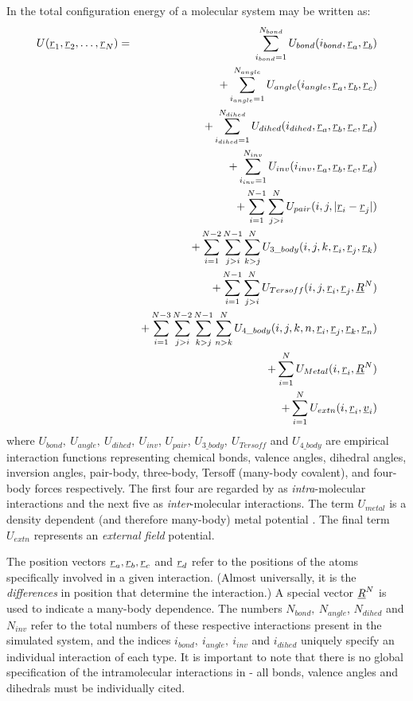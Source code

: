 In \D{} the total configuration energy of a molecular system may
be written as:
\begin{eqnarray}
U(\mbox{$\underline{r}$}_{1},\mbox{$\underline{r}$}_{2},\ldots,\mbox{$\underline{r}$}_{N})&=&
\sum_{i_{bond}=1}^{N_{bond}}
U_{bond}(i_{bond},\mbox{$\underline{r}$}_{a},\mbox{$\underline{r}$}_{b}) \nonumber \\ & &
+\sum_{i_{angle}=1}^{N_{angle}}
U_{angle}(i_{angle},\mbox{$\underline{r}$}_{a},\mbox{$\underline{r}$}_{b},\mbox{$\underline{r}$}_{c})\nonumber \\
& & +\sum_{i_{dihed}=1}^{N_{dihed}}
U_{dihed}(i_{dihed},\mbox{$\underline{r}$}_{a},\mbox{$\underline{r}$}_{b},\mbox{$\underline{r}$}_{c},\mbox{$\underline{r}$}_{d})
\nonumber \\ & & +\sum_{i_{inv}=1}^{N_{inv}} 
U_{inv}(i_{inv},\mbox{$\underline{r}$}_{a},\mbox{$\underline{r}$}_{b},\mbox{$\underline{r}$}_{c},\mbox{$\underline{r}$}_{d})
\nonumber \\ & & +\sum_{i=1}^{N-1}\sum_{j>i}^{N}
U_{pair}(i,j,|\mbox{$\underline{r}$}_{i}-\mbox{$\underline{r}$}_{j}|) \nonumber \\ & &
+\sum_{i=1}^{N-2}\sum_{j>i}^{N-1}\sum_{k>j}^{N}
U_{3\_body}(i,j,k,\mbox{$\underline{r}$}_{i},\mbox{$\underline{r}$}_{j},\mbox{$\underline{r}$}_{k}) \nonumber \\ & &
+\sum_{i=1}^{N-1}\sum_{j>i}^{N}
U_{Tersoff}(i,j,\mbox{$\underline{r}$}_{i},\mbox{$\underline{r}$}_{j},\mbox{$\underline{R}$}^{N}) \nonumber \\ & &
+\sum_{i=1}^{N-3}\sum_{j>i}^{N-2}\sum_{k>j}^{N-1}\sum_{n>k}^{N}
U_{4\_body}(i,j,k,n,\mbox{$\underline{r}$}_{i},\mbox{$\underline{r}$}_{j},\mbox{$\underline{r}$}_{k},\mbox{$\underline{r}$}_{n})
\nonumber \\ & &
+\sum_{i=1}^{N}U_{Metal}(i,\mbox{$\underline{r}$}_{i},\mbox{$\underline{R}$}^{N}) \nonumber\\ & &
+\sum_{i=1}^{N}U_{extn}(i,\mbox{$\underline{r}$}_{i},\mbox{$\underline{v}$}_{i})
\end{eqnarray}
where $U_{bond},~U_{angle},~U_{dihed},~U_{inv}$, $U_{pair}$,
$U_{3\_body},~U_{Tersoff}$ 
and $U_{4\_body}$ are empirical interaction functions
representing chemical bonds, valence angles, dihedral angles,
inversion angles, pair-body,
three-body,
Tersoff (many-body covalent),
and four-body forces
respectively.  The first four are regarded by \D{} as {\em
intra}-molecular interactions and the next five as {\em
inter}-molecular interactions. The term $U_{metal}$ is a
density dependent (and therefore many-body) metal 
potential .
The final term $U_{extn}$ represents an
{\em external field} potential. 

The position vectors
$\mbox{$\underline{r}$}_{a},\mbox{$\underline{r}$}_{b},\mbox{$\underline{r}$}_{c}$ and $\mbox{$\underline{r}$}_{d}$ refer to the
positions of the atoms specifically involved in a given interaction.
(Almost universally, it is the {\em differences} in position that
determine the interaction.) A special vector $\mbox{$\underline{R}$}^{N}$ is used to
indicate a many-body dependence. The numbers $N_{bond},~N_{angle}$,
$N_{dihed}$ and $N_{inv}$ refer to the total numbers of these
respective interactions present in the simulated system, and the
indices $i_{bond},~i_{angle},~i_{inv}$ and $i_{dihed}$ uniquely specify an
individual interaction of each type.  It is important to note that
there is no global specification of the intramolecular interactions in
\D{} - all bonds, valence angles and dihedrals must be
individually cited.


